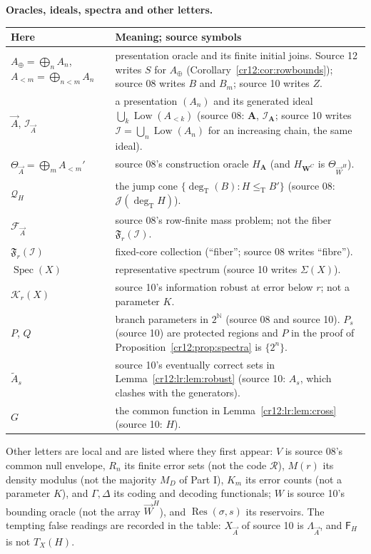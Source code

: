 \documentclass[11pt,letterpaper]{article}
\theoremstyle{plain}
\theoremstyle{definition}
\theoremstyle{remark}
\numberwithin{equation}{section}
\newcommand{\N}{\mathbb N}
\newcommand{\leT}{\leq_{\mathrm T}}
\newcommand{\Low}{\operatorname{Low}}
\newcommand{\Spec}{\operatorname{Spec}}
\newcommand{\degT}{\deg_{\mathrm T}}
\newcommand{\Rcode}{\mathcal R}
\newcommand{\I}{\mathcal I}
\newcommand{\fiber}{\mathfrak F}
\newcommand{\Aplus}{A_{\oplus}}          %
\newcommand{\Alt}[1]{A_{<#1}}            %
\newcommand{\Fint}{\mathsf F}            %
\newcommand{\FF}{\mathcal F}             %
\newcommand{\WW}{\vec W}                 %
\newcommand{\Lam}{\Lambda_{\vec A}}      %
\newcommand{\Res}{\operatorname{Res}}
\begin{document}
\medskip
\noindent\textbf{Oracles, ideals, spectra and other letters.}\par\nopagebreak[4]
\begin{xltabular}{\textwidth}{@{}>{\raggedright\arraybackslash}p{.27\textwidth}>{\raggedright\arraybackslash}X@{}}
\toprule
Here & Meaning; source symbols\\
\midrule
\endhead
$\Aplus=\bigoplus_nA_n$,\newline $\Alt m=\bigoplus_{n<m}A_n$ & presentation oracle and its finite
initial joins. Source 12 writes $S$ for $\Aplus$ (Corollary~\ref{cr12:cor:rowbounds});
source 08 writes $B$ and $B_m$; source 10 writes $Z$.\\
$\vec A$, $\I_{\vec A}$ & a presentation $(A_n)$ and its generated ideal
$\bigcup_k\Low(\Alt k)$ (source 08: $\boldsymbol A$, $\mathcal I_{\boldsymbol A}$; source 10
writes $\I=\bigcup_n\Low(A_n)$ for an increasing chain, the same ideal).\\
$\Theta_{\vec A}=\bigoplus_m\Alt m'$ & source 08's construction oracle $H_{\boldsymbol A}$ (and
$H_{\boldsymbol W^C}$ is $\Theta_{\WW^H}$).\\
$\mathcal Q_H$ & the jump cone $\{\degT(B):H\leT B'\}$ (source 08: $\mathcal J(\degT H)$).\\
$\FF_{\vec A}$ & source 08's row-finite mass problem; not the fiber $\fiber_r(\I)$.\\
$\fiber_r(\I)$ & fixed-core collection (``fiber''; source 08 writes ``fibre'').\\
$\Spec(X)$ & representative spectrum (source 10 writes $\Sigma(X)$).\\
$\mathcal K_r(X)$ & source 10's information robust at error below $r$; not a parameter $K$.\\
$P$, $Q$ & branch parameters in $2^\N$ (source 08 and source 10). $P_s$ (source 10) are
protected regions and $P$ in the proof of Proposition~\ref{cr12:prop:spectra} is $\{2^n\}$.\\
$\tilde A_s$ & source 10's eventually correct sets in Lemma~\ref{cr12:lr:lem:robust}
(source 10: $A_s$, which clashes with the generators).\\
$G$ & the common function in Lemma~\ref{cr12:lr:lem:cross} (source 10: $H$).\\
\bottomrule
\end{xltabular}
\endgroup

Other letters are local and are listed where they first appear: $V$ is source
08's common null envelope, $R_n$ its finite error sets (not the code $\Rcode$),
$M(r)$ its density modulus (not the majority $M_D$ of Part I), $K_m$ its error
counts (not a parameter $K$), and $\Gamma,\Delta$ its coding and decoding
functionals; $W$ is source 10's bounding oracle (not the array $\WW^H$), and
$\Res(\sigma,s)$ its reservoirs. The tempting false readings are recorded in the
table: $X_{\vec A}$ of source 10 is $\Lam$, and $\Fint_H$ is not $T_X(H)$.
\end{document}
